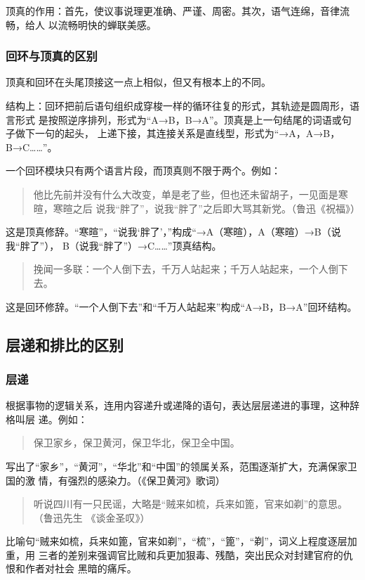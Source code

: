 \documentclass[final,oneside]{ctexbook}
\newenvironment{equotation}{\begin{quotation}\kaishu}{\end{quotation}}
\begin{document}
顶真的作用：首先，使议事说理更准确、严谨、周密。其次，语气连绵，音律流畅，给人
以流畅明快的蝉联美感。

\subsubsection{回环与顶真的区别}

顶真和回环在头尾顶接这一点上相似，但又有根本上的不同。

结构上：回环把前后语句组织成穿梭一样的循环往复的形式，其轨迹是圆周形，语言形式
是按照逆序排列，形式为“A→B，B→A”。顶真是上一句结尾的词语或句子做下一句的起头，
上递下接，其连接关系是直线型，形式为“→A，A→B，B→C……”。

一个回环模块只有两个语言片段，而顶真则不限于两个。例如：

\begin{equotation}
  他比先前并没有什么大改变，单是老了些，但也还未留胡子，一见面是寒暄，寒暄之后
  说我“胖了”，说我“胖了”之后即大骂其新党。（鲁迅《祝福》）
\end{equotation}
这是顶真修辞。“寒暄”，“说我‘胖了’，”构成“→A（寒暄），A（寒暄）→B（说我“胖了”），
B（说我“胖了”）→C……”顶真结构。

\begin{equotation}
  挽闻一多联：一个人倒下去，千万人站起来；千万人站起来，一个人倒下去。
\end{equotation}
这是回环修辞。“一个人倒下去”和“千万人站起来”构成“A→B，B→A”回环结构。

\subsection{层递和排比的区别}

\subsubsection{层递}

根据事物的逻辑关系，连用内容递升或递降的语句，表达层层递进的事理，这种辞格叫层
递。例如：

\begin{equotation}
  保卫家乡，保卫黄河，保卫华北，保卫全中国。
\end{equotation}
写出了“家乡”，“黄河”，“华北”和“中国”的领属关系，范围逐渐扩大，充满保家卫国的激
情，有强烈的感染力。（《保卫黄河》歌词）

\begin{equotation}
  听说四川有一只民谣，大略是“贼来如梳，兵来如篦，官来如剃”的意思。（鲁迅先生
  《谈金圣叹》）
\end{equotation}
比喻句“贼来如梳，兵来如篦，官来如剃”，“梳”，“篦”，“剃”，词义上程度逐层加重，用
三者的差别来强调官比贼和兵更加狠毒、残酷，突出民众对封建官府的仇恨和作者对社会
黑暗的痛斥。
\end{document}
